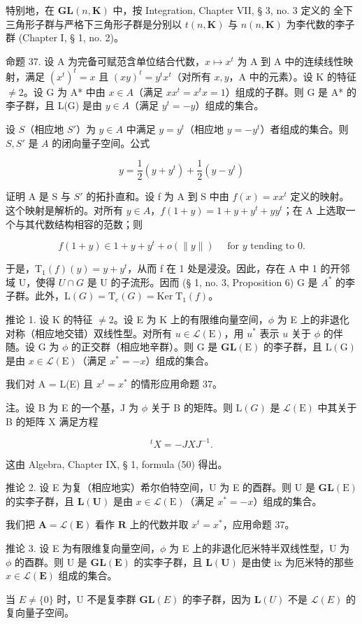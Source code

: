 特别地，在 \(\mathbf{GL}(n,\mathbf{K})\) 中，按 Integration, Chapter VII, § 3, no. 3 定义的 全下三角形子群与严格下三角形子群是分别以 \(t(n,\mathbf{K})\) 与 \(n(n,\mathbf{K})\) 为李代数的李子群 (Chapter I, § 1, no. 2)。

命题 37. 设 A 为完备可赋范含单位结合代数，\(x \mapsto x^t\) 为 A 到 A 中的连续线性映射，满足 \((x^t)^t = x\) 且 \((xy)^t = y^t x^t\)（对所有 \(x, y\)，A 中的元素）。设 K 的特征 \(\neq 2\)。设 G 为 A* 中由 \(x \in A\)（满足 \(xx^t = x^t x = 1\)）组成的子群。则 G 是 A* 的李子群，且 L(G) 是由 \(y \in A\)（满足 \(y^t = -y\)）组成的集合。

设 \(S\)（相应地 \(S'\)）为 \(y \in A\) 中满足 \(y = y^t\)（相应地 \(y = -y^t\)）者组成的集合。则 \(S, S'\) 是 \(A\) 的闭向量子空间。公式

\[
y = \frac {1}{2} (y + y ^ {t}) + \frac {1}{2} (y - y ^ {t})
\]

证明 A 是 S 与 \(S'\) 的拓扑直和。设 f 为 A 到 S 中由 \(f(x) = xx^{t}\) 定义的映射。这个映射是解析的。对所有 \(y \in A\)，\(f(1 + y) = 1 + y + y^{t} + yy^{t}\)；在 A 上选取一个与其代数结构相容的范数；则

\[
f (1 + y) \in 1 + y + y ^ {t} + o (\| y \|) \quad \text { for   } y \text {   tending   to   } 0.
\]

于是，\(\mathrm{T}_{1}(f)(y)=y+y^{t}\)，从而 f 在 1 处是浸没。因此，存在 A 中 1 的开邻域 U，使得 \(U\cap G\) 是 U 的子流形。因而 (§ 1, no. 3, Proposition 6) G 是 \(A^{*}\) 的李子群。此外，\(\mathrm{L}(G)=\mathrm{T}_{e}(G)=\mathrm{Ker}\;\mathrm{T}_{1}(f)\)。

推论 1. 设 K 的特征 \(\neq 2\)。设 E 为 K 上的有限维向量空间，\(\phi\) 为 E 上的非退化对称（相应地交错）双线性型。对所有 \(u \in \mathcal{L}(\mathrm{E})\)，用 \(u^*\) 表示 \(u\) 关于 \(\phi\) 的伴随。设 G 为 \(\phi\) 的正交群（相应地辛群）。则 G 是 \(\mathbf{GL}(\mathrm{E})\) 的李子群，且 \(\mathrm{L}(\mathrm{G})\) 是由 \(x \in \mathcal{L}(\mathrm{E})\)（满足 \(x^* = -x\)）组成的集合。

我们对 A = L(E) 且 \(x^{t} = x^{*}\) 的情形应用命题 37。

注。设 B 为 E 的一个基，J 为 \(\phi\) 关于 B 的矩阵。则 \(\mathrm{L}(G)\) 是 \(\mathcal{L}(\mathrm{E})\) 中其关于 B 的矩阵 X 满足方程

\[
{ } ^ { t } X = - J X J ^ { - 1 } .
\]

这由 Algebra, Chapter IX, § 1, formula (50) 得出。

推论 2. 设 E 为复（相应地实）希尔伯特空间，U 为 E 的酉群。则 U 是 \(\mathbf{GL}(\mathrm{E})\) 的实李子群，且 \(\mathbf{L}(\mathbf{U})\) 是由 \(x \in \mathcal{L}(\mathrm{E})\)（满足 \(x^{*} = -x\)）组成的集合。

我们把 \(\mathbf{A} = \mathcal{L}(\mathbf{E})\) 看作 \(\mathbf{R}\) 上的代数并取 \(x^t = x^*\)，应用命题 37。

推论 3. 设 E 为有限维复向量空间，\(\phi\) 为 E 上的非退化厄米特半双线性型，U 为 \(\phi\) 的酉群。则 U 是 \(\mathbf{GL}(\mathbf{E})\) 的实李子群，且 \(\mathbf{L}(\mathbf{U})\) 是由使 ix 为厄米特的那些 \(x \in \mathcal{L}(\mathbf{E})\) 组成的集合。

当 \(E \neq \{0\}\) 时，U 不是复李群 \(\mathbf{GL}(E)\) 的李子群，因为 \(\mathbf{L}(U)\) 不是 \(\mathcal{L}(E)\) 的复向量子空间。

